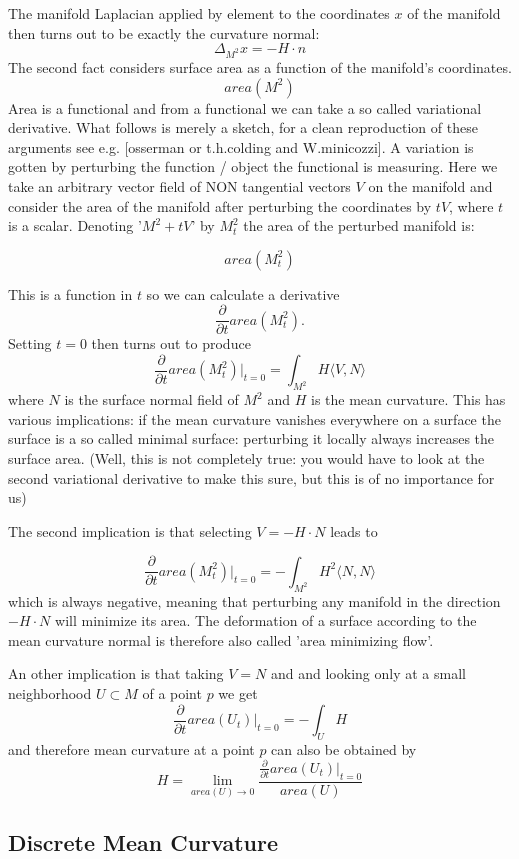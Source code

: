 The manifold Laplacian applied by element to the coordinates $x$ of the manifold then turns out to be exactly the curvature normal:
\[\Delta_{M^2}x= -H\cdot n\]
The second fact considers surface area as a function of the manifold's coordinates.
\[area(M^2)\]
Area is a functional and from a functional we can take a so called variational derivative. What follows is merely a sketch, for a clean reproduction of these arguments see e.g. [osserman or t.h.colding and W.minicozzi]. A variation is gotten by perturbing the function / object the functional is measuring. Here we take an arbitrary vector field of NON tangential vectors $V$ on the manifold and consider the area of the manifold after perturbing the coordinates by $tV$, where $t$ is a scalar. Denoting '$M^2 + tV$' by $M^2_t$ the area of the perturbed manifold is:

\[area(M^2_t)\]

This is a function in $t$ so we can calculate a derivative
\[\frac{\partial}{\partial t}area(M^2_t).\]
Setting $t=0$ then turns out to produce
\[\frac{\partial}{\partial t}area(M^2_t)|_{t=0} = \int_{M^2}H\langle V, N \rangle\]
where $N$ is the surface normal field of $M^2$ and $H$ is the mean curvature. This has various implications: if the mean curvature vanishes everywhere on a surface the surface is a so called minimal surface: perturbing it locally always increases the surface area. (Well, this is not completely true: you would have to look at the second variational derivative to make this sure, but this is of no importance for us)

The second implication is that selecting $V = -H\cdot N$ leads to

\[\frac{\partial}{\partial t}area(M^2_t)|_{t=0} = -\int_{M^2}H^2\langle N, N \rangle\]
which is always negative, meaning that perturbing any manifold in the direction $-H\cdot N$ will minimize its area. The deformation of a surface according to the mean curvature normal is therefore also called 'area minimizing flow'.

An other implication is that taking $V= N$ and and looking only at a small neighborhood $U \subset M$ of a point $p$ we get
\[\frac{\partial}{\partial t}area(U_t)|_{t=0} = -\int_{U}H\]
and therefore mean curvature at a point $p$ can also be obtained by
\[ H=\lim_{area(U) \rightarrow 0}\frac{\frac{\partial}{\partial t}area(U_t)|_{t=0}}{area(U)}\]

\subsection{Discrete Mean Curvature}

